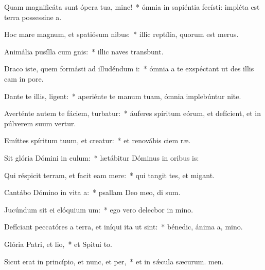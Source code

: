 \item Quam magnificáta sunt ópera tua, mine!~* ómnia in sapiéntia fecísti: impléta est terra possessine a.
\item Hoc mare magnum, et spatiósum nibus:~* illic reptília, quorum  est merus.
\item Animália pusílla cum gnis:~* illic naves transbunt.
\item Draco iste, quem formásti ad illudéndum i:~* ómnia a te exspéctant ut des illis cam in pore.
\item Dante te illis, ligent:~* aperiénte te manum tuam, ómnia implebúntur nite.
\item Averténte autem te fáciem, turbatur:~* áuferes spíritum eórum, et defícient, et in púlverem suum vertur.
\item Emíttes spíritum tuum, et creatur:~* et renovábis ciem ræ.
\item Sit glória Dómini in culum:~* lætábitur Dóminus in oribus is:
\item Qui réspicit terram, et facit eam mere:~* qui tangit tes, et migant.
\item Cantábo Dómino in vita a:~* psallam Deo meo, di sum.
\item Jucúndum sit ei elóquium um:~* ego vero delecbor in mino.
\item Defíciant peccatóres a terra, et iníqui ita ut  sint:~* bénedic, ánima a, mino.
\item Glória Patri, et lio,~* et Spitui to.
\item Sicut erat in princípio, et nunc, et per,~* et in sǽcula sæcurum. men.
